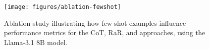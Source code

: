 \begin{figure}[t]
    \centering
    \texttt{[image: figures/ablation-fewshot]}
    \caption{Ablation study illustrating how few-shot examples influence performance metrics for the CoT, RaR, and \rephrase{} approaches, using the Llama-3.1 8B model.}
    \label{fig:fewshot}
\end{figure}
